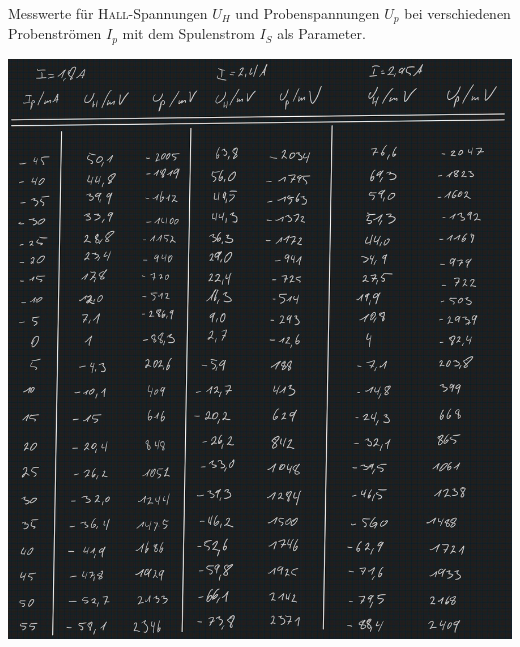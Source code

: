 \begin{table}[h]
    \centering
    \caption[Messwertetabelle]{Messwerte für \textsc{Hall}-Spannungen $U_H$ und Probenspannungen $U_p$ bei verschiedenen Probenströmen $I_p$ mit dem Spulenstrom $I_S$ als Parameter.}
    \includegraphics[height=.8\textheight]{messungen/messungen.jpg}
    \label{tab:messwerte}
\end{table}